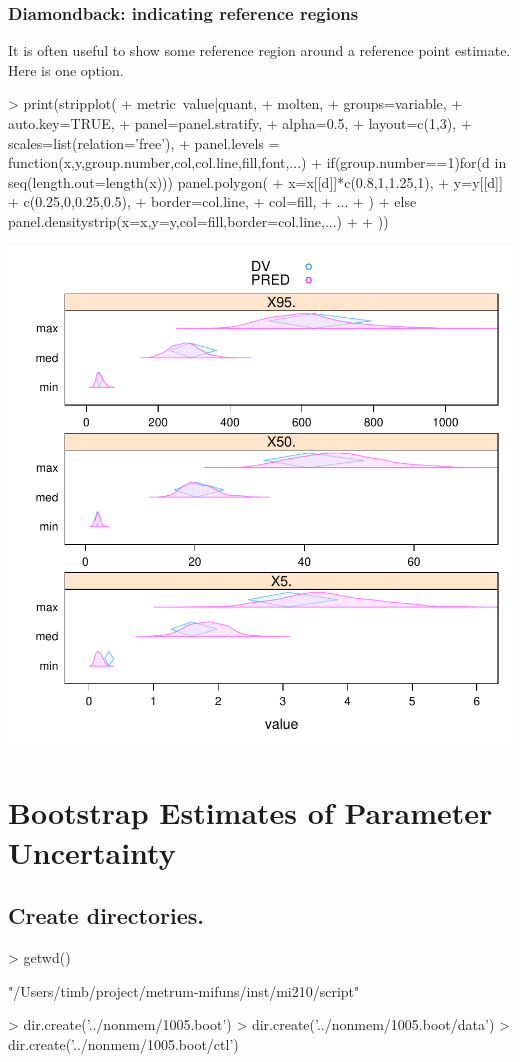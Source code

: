 \subsubsection{Diamondback: indicating reference regions}
It is often useful to show some reference region around a reference point estimate.
Here is one option.  
\begin{Schunk}
\begin{Sinput}
> print(stripplot(
+ 	metric~value|quant,
+ 	molten,
+ 	groups=variable,
+ 	auto.key=TRUE,
+ 	panel=panel.stratify,
+ 	alpha=0.5,
+ 	layout=c(1,3),
+ 	scales=list(relation='free'),
+ 	panel.levels = function(x,y,group.number,col,col.line,fill,font,...){
+ 		if(group.number==1)for(d in seq(length.out=length(x))) panel.polygon(
+ 			x=x[[d]]*c(0.8,1,1.25,1),
+ 			y=y[[d]] + c(0.25,0,0.25,0.5),
+ 			border=col.line,
+ 			col=fill,
+ 			...
+ 		)
+ 		else panel.densitystrip(x=x,y=y,col=fill,border=col.line,...)
+ 	}
+ ))
\end{Sinput}
\end{Schunk}
\includegraphics{model1-diamondBack}
\section{Bootstrap Estimates of Parameter Uncertainty}
\subsection{Create directories.}
\begin{Schunk}
\begin{Sinput}
> getwd()
\end{Sinput}
\begin{Soutput}
[1] "/Users/timb/project/metrum-mifuns/inst/mi210/script"
\end{Soutput}
\begin{Sinput}
> dir.create('../nonmem/1005.boot')
> dir.create('../nonmem/1005.boot/data')
> dir.create('../nonmem/1005.boot/ctl')
\end{Sinput}
\end{Schunk}
